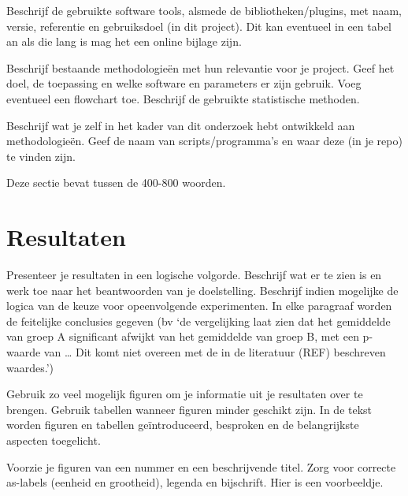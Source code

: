 \documentclass[
]{article}
\begin{document}
Beschrijf de gebruikte software tools, alsmede de bibliotheken/plugins, met naam, versie, referentie en gebruiksdoel (in dit project). Dit kan eventueel in een tabel an als die lang is mag het een online bijlage zijn.

Beschrijf bestaande methodologieën met hun relevantie voor je project. Geef het doel, de toepassing en welke software en parameters er zijn gebruik. Voeg eventueel een flowchart toe.
Beschrijf de gebruikte statistische methoden.

Beschrijf wat je zelf in het kader van dit onderzoek hebt ontwikkeld aan methodologieën. Geef de naam van scripts/programma's en waar deze (in je repo) te vinden zijn.

Deze sectie bevat tussen de 400-800 woorden.

\hypertarget{resultaten}{%
\section{Resultaten}\label{resultaten}}

Presenteer je resultaten in een logische volgorde. Beschrijf wat er te zien is en werk toe naar het beantwoorden van je doelstelling. Beschrijf indien mogelijke de logica van de keuze voor opeenvolgende experimenten. In elke paragraaf worden de feitelijke conclusies gegeven (bv `de vergelijking laat zien dat het gemiddelde van groep A significant afwijkt van het gemiddelde van groep B, met een p-waarde van \ldots{} Dit komt niet overeen met de in de literatuur (REF) beschreven waardes.')

Gebruik zo veel mogelijk figuren om je informatie uit je resultaten over te brengen. Gebruik tabellen wanneer figuren minder geschikt zijn. In de tekst worden figuren en tabellen geïntroduceerd, besproken en de belangrijkste aspecten toegelicht.

Voorzie je figuren van een nummer en een beschrijvende titel. Zorg voor correcte as-labels (eenheid en grootheid), legenda en bijschrift. Hier is een voorbeeldje.
\end{document}
